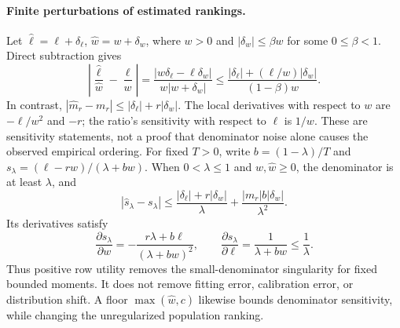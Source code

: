 \paragraph{Finite perturbations of estimated rankings.}
Let $\widehat\ell=\ell+\delta_\ell$,
$\widehat w=w+\delta_w$, where $w>0$ and
$|\delta_w|\leq\beta w$ for some $0\leq\beta<1$. Direct subtraction gives
\[
 \left|\frac{\widehat\ell}{\widehat w}-\frac\ell w\right|
 =\frac{|w\delta_\ell-\ell\delta_w|}{w|w+\delta_w|}
 \leq\frac{|\delta_\ell|+(\ell/w)|\delta_w|}{(1-\beta)w}.
\]
In contrast, $|\widehat m_r-m_r|\leq|\delta_\ell|+r|\delta_w|$.
The local derivatives with respect to $w$ are $-\ell/w^2$ and $-r$;
the ratio's sensitivity with respect to $\ell$ is $1/w$.
These are sensitivity statements, not a proof that denominator
noise alone causes the observed empirical ordering.
For fixed $T>0$, write $b=(1-\lambda)/T$ and
$s_\lambda=(\ell-rw)/(\lambda+bw)$. When $0<\lambda\leq1$ and
$w,\widehat w\geq0$, the denominator is at least $\lambda$, and
\[
 \left|\widehat s_\lambda-s_\lambda\right|
 \leq\frac{|\delta_\ell|+r|\delta_w|}{\lambda}
 +\frac{|m_r|b|\delta_w|}{\lambda^2}.
\]
Its derivatives satisfy
\[
 \frac{\partial s_\lambda}{\partial w}
 =-\frac{r\lambda+b\ell}{(\lambda+bw)^2},\qquad
 \frac{\partial s_\lambda}{\partial\ell}
 =\frac{1}{\lambda+bw}\leq\frac1\lambda.
\]
Thus positive row utility removes the small-denominator singularity
for fixed bounded moments. It does not remove fitting error,
calibration error, or distribution shift. A floor $\max(\widehat w,c)$
likewise bounds denominator sensitivity, while changing the
unregularized population ranking.
